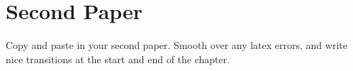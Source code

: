 \chapter{Second Paper}\label{ch:4}

Copy and paste in your second paper. Smooth over any latex errors, and write nice transitions at the start and end of the chapter.